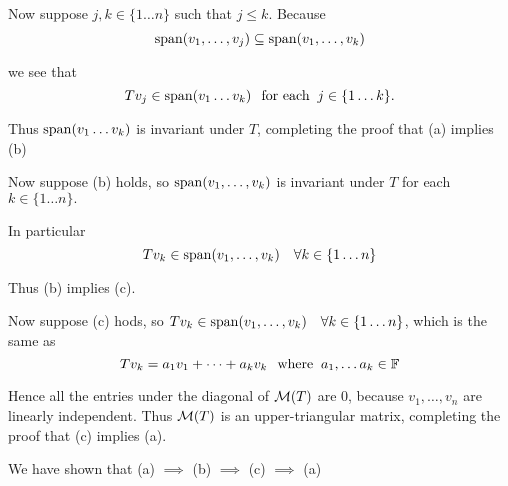 \begin{prf}
  Now suppose $j, k \in \{1 \ldots n \}$ such that $j \leq  k.$ Because
  \begin{equation}
    \operatorname{span} (v_1, \ldots, v_j) \subseteq \operatorname{span} (v_1, \ldots, v_k)
  \end{equation} 
  
  we see that
  \begin{equation}
    T v_j \in \operatorname{span} (v_1 \ldots v_k) \;\;\, \text{for each}\;\; j \in \{1 \ldots k\}.
  \end{equation}

  Thus $\operatorname{span} (v_1 \ldots v_k)$ is invariant under $T$, completing the proof that (a) implies (b)
  
  Now suppose (b) holds, so $\operatorname{span} (v_1, \ldots, v_k)$ is invariant under $T$ for each $k \in \{1 \ldots n\}.$ 
  
  In particular
  \begin{equation}
    T v_k \in \operatorname{span} (v_1, \ldots, v_k) \quad \forall k \in \{1 \ldots n\}
  \end{equation}
  
  Thus (b) implies (c).
  
  Now suppose (c) hods, so $T v_k \in \operatorname{span} (v_1, \ldots, v_k) \quad \forall k \in \{1 \ldots n\}$, which is the same as
  \begin{equation}
    T v_k = a_1 v_1 + \cdots + a_k v_k \;\;\, \text{where}\;\; a_1, \dots a_k \in \mathbb{F}
  \end{equation}
  
  Hence all the entries under the diagonal of $\mathcal{M} (T)$ are $0$, because $v_1, \ldots, v_n$ are linearly independent. Thus $\mathcal{M}(T)$ is an upper-triangular matrix, completing the proof that (c) implies (a).
  
  We have shown that (a) $\implies$ (b) $\implies$ (c) $\implies$ (a)
  
\end{prf}

